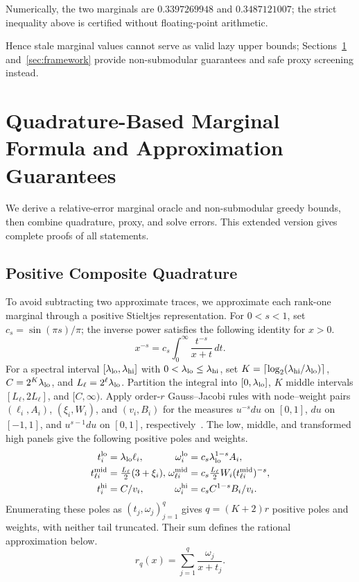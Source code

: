 \documentclass[conference]{IEEEtran}
\theoremstyle{definition}
\begin{document}
Numerically, the two marginals are $0.3397269948$ and $0.3487121007$; the strict inequality above is certified without floating-point arithmetic.

Hence stale marginal values cannot serve as valid lazy upper bounds;
Sections~\ref{sec:guarantees} and~\ref{sec:framework} provide
non-submodular guarantees and safe proxy screening instead.

\section{Quadrature-Based Marginal Formula and Approximation Guarantees}
\label{sec:guarantees}

We derive a relative-error marginal oracle and non-submodular greedy
bounds, then combine quadrature, proxy, and solve errors.
This extended version gives complete proofs of all statements.

\subsection{Positive Composite Quadrature}
To avoid subtracting two approximate traces, we approximate each
rank-one marginal through a positive Stieltjes representation.
For $0<s<1$, set $c_s=\sin(\pi s)/\pi$; the inverse power
satisfies the following identity for $x>0$.
\begin{equation}
x^{-s}=c_s\int_0^\infty\frac{t^{-s}}{x+t}\,dt.
\label{eq:stieltjes}
\end{equation}
For a spectral interval $[\lambda_{\rm lo},\lambda_{\rm hi}]$ with $0<\lambda_{\rm lo}\le \lambda_{\rm hi}$, set
$K=\lceil\log_2(\lambda_{\rm hi}/\lambda_{\rm lo})\rceil$, $C=2^K\lambda_{\rm lo}$, and $L_\ell=2^\ell \lambda_{\rm lo}$.
Partition the integral into $[0,\lambda_{\rm lo}]$, $K$ middle intervals
$[L_\ell,2L_\ell]$, and $[C,\infty)$. Apply order-$r$
Gauss--Jacobi rules with node--weight pairs $(\ell_i,A_i)$,
$(\xi_i,W_i)$, and $(v_i,B_i)$ for the measures $u^{-s}du$
on $[0,1]$, $du$ on $[-1,1]$, and $u^{s-1}du$ on $[0,1]$,
respectively~\cite{dlmf-quadrature,dlmf-jacobi}. The low, middle,
and transformed high panels give the following positive poles and weights.
\begin{equation}
\begin{alignedat}{2}
t_i^{\mathrm{lo}}&=\lambda_{\rm lo}\ell_i,&\quad
\omega_i^{\mathrm{lo}}&=c_s\lambda_{\rm lo}^{1-s}A_i,\\
t_{\ell i}^{\mathrm{mid}}&=\tfrac{L_\ell}{2}(3+\xi_i),&
\omega_{\ell i}^{\mathrm{mid}}&=c_s\tfrac{L_\ell}{2}W_i
(t_{\ell i}^{\mathrm{mid}})^{-s},\\
t_i^{\mathrm{hi}}&=C/v_i,&
\omega_i^{\mathrm{hi}}&=c_sC^{1-s}B_i/v_i.
\end{alignedat}
\label{eq:poles}
\end{equation}
Enumerating these poles as $(t_j,\omega_j)_{j=1}^q$ gives
$q=(K+2)r$ positive poles and weights, with neither tail truncated.
Their sum defines the rational approximation below.
\begin{equation}
r_q(x)=\sum_{j=1}^q\frac{\omega_j}{x+t_j}.
\label{eq:rational}
\end{equation}
\end{document}
